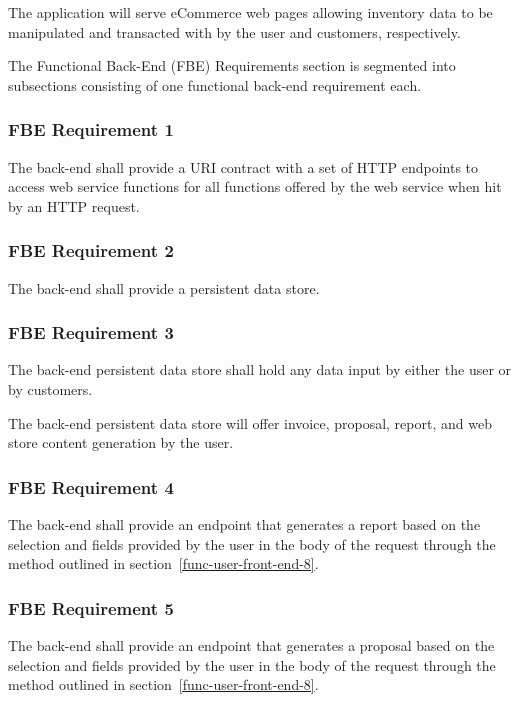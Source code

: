 \documentclass{article}
\begin{document}
The application will serve eCommerce web pages allowing inventory data to be
manipulated and transacted with by the user and customers, respectively.

The Functional Back-End (FBE) Requirements section is segmented into subsections
consisting of one functional back-end requirement each.

\subsubsection{FBE Requirement 1}
\label{func-back-end-1}

The back-end shall provide a URI contract with a set of HTTP endpoints
to access web service functions for all functions offered by the web service
when hit by an HTTP request.

\subsubsection{FBE Requirement 2}
\label{func-back-end-2}

The back-end shall provide a persistent data store.

\subsubsection{FBE Requirement 3}
\label{func-back-end-3}

The back-end persistent data store shall hold any data input by either the
user or by customers.

The back-end persistent data store will offer invoice, proposal, report, and web
store content generation by the user.

\subsubsection{FBE Requirement 4}
\label{func-back-end-4}

The back-end shall provide an endpoint that generates a report based on the
selection and fields provided by the user in the body of the request through
the method outlined in section~\ref{func-user-front-end-8}.

\subsubsection{FBE Requirement 5}
\label{func-back-end-5}

The back-end shall provide an endpoint that generates a proposal based on the
selection and fields provided by the user in the body of the request through
the method outlined in section~\ref{func-user-front-end-8}.
\end{document}
